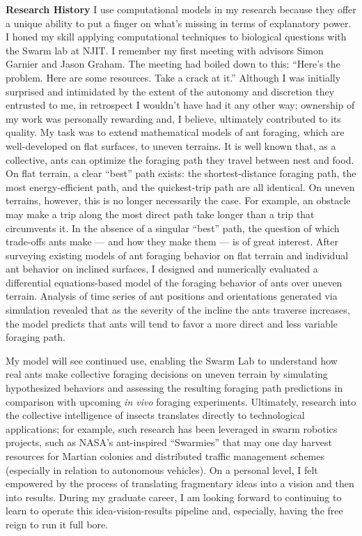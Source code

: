 \textbf{Research History}
I use computational models in my research because they offer a unique ability to put a finger on what's missing in terms of explanatory power.
I honed my skill applying computational techniques to biological questions with the Swarm lab at NJIT.
I remember my first meeting with advisors Simon Garnier and Jason Graham.
The meeting had boiled down to this:
``Here's the problem.
Here are some resources.
Take a crack at it.''
Although I was initially surprised and intimidated by the extent of the autonomy and discretion they entrusted to me, in retrospect I wouldn't have had it any other way;
ownership of my work was personally rewarding and, I believe, ultimately contributed to its quality.
My task was to extend mathematical models of ant foraging, which are well-developed on flat surfaces, to uneven terrains.
It is well known that, as a collective, ants can optimize the foraging path they travel between nest and food.
On flat terrain, a clear ``best'' path exists: the shortest-distance foraging path, the most energy-efficient path, and the quickest-trip path are all identical.
On uneven terrains, however, this is no longer necessarily the case.
For example, an obstacle may make a trip along the most direct path take longer than a trip that circumvents it.
In the absence of a singular ``best'' path, the question of which trade-offs ants make --- and how they make them --- is of great interest.
After surveying existing models of ant foraging behavior on flat terrain and individual ant behavior on inclined surfaces, I designed and numerically evaluated a differential equations-based model of the foraging behavior of ants over uneven terrain.
Analysis of time series of ant positions and orientations generated via simulation revealed that as the severity of the incline the ants traverse increases, the model predicts that ants will tend to favor a more direct and less variable foraging path.

My model will see continued use, enabling the Swarm Lab to understand how real ants make collective foraging decisions on uneven terrain by simulating hypothesized behaviors and assessing the resulting foraging path predictions in comparison with upcoming \textit{in vivo} foraging experiments.
Ultimately, research into the collective intelligence of insects translates directly to technological applications;
for example, such research has been leveraged in swarm robotics projects, such as NASA's ant-inspired ``Swarmies'' that may one day harvest resources for Martian colonies and distributed traffic management schemes (especially in relation to autonomous vehicles).
On a personal level, I felt empowered by the process of translating fragmentary ideas into a vision and then into results.
During my graduate career, I am looking forward to continuing to learn to operate this idea-vision-results pipeline and, especially, having the free reign to run it full bore.

